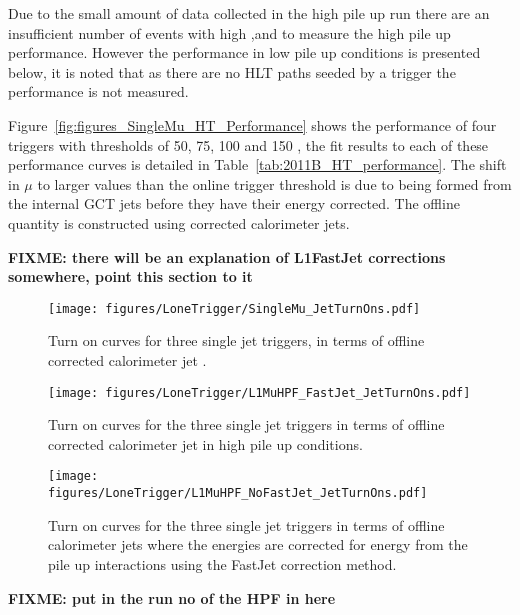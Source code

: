 Due to the small amount of data collected in the high pile up run there are 
an insufficient number of events with high \MET,\HTm and \HT to measure the 
high pile up performance. However the performance in low pile up conditions is 
presented below, it is noted that as there are no HLT paths seeded by a \Lone 
\ET trigger the performance is not measured.

Figure~\ref{fig:figures_SingleMu_HT_Performance} shows the performance of four
\Lone \HT triggers with thresholds of 50, 75, 100 and 150 \GeV, the fit results 
to each of these performance curves is detailed in 
Table~\ref{tab:2011B_HT_performance}. The shift in $\mu$ to larger values than 
the online \Lone trigger threshold is due to \Lone \HT being formed from the 
internal GCT jets before they have their energy corrected. The offline quantity 
is constructed using corrected \AK calorimeter jets.




\textbf{FIXME: there will be an explanation of L1FastJet corrections somewhere, 
point this section to it}
\begin{figure}[ht]
  \centering
    \texttt{[image: figures/LoneTrigger/SingleMu\_JetTurnOns.pdf]}
  \caption{Turn on curves for three \Lone single jet triggers, in terms of 
  offline corrected \AK calorimeter jet \ET.}
  \label{fig:figures_LoneTrigger_SingleMu_JetTurnOns}
\end{figure}

\begin{figure}[ht]
  \centering
    \texttt{[image: figures/LoneTrigger/L1MuHPF\_FastJet\_JetTurnOns.pdf]}
  \caption{Turn on curves for the three \Lone single jet triggers in terms of 
  offline corrected \AK calorimeter jet \ET in high pile up conditions.}
  \label{fig:figures_LoneTrigger_L1MuHPF_FastJet_JetTurnOns}
\end{figure}


\begin{figure}[ht]
  \centering
    \texttt{[image: figures/LoneTrigger/L1MuHPF\_NoFastJet\_JetTurnOns.pdf]}
  \caption{Turn on curves for the three \Lone single jet triggers in terms of 
  offline \AK calorimeter jets where the energies are corrected for energy from 
  the pile up interactions using the FastJet correction method.}
  \label{fig:figures_LoneTrigger_L1MuHPF_NoFastJet_JetTurnOns}
\end{figure}

\textbf{FIXME: put in the run no of the HPF in here} 


